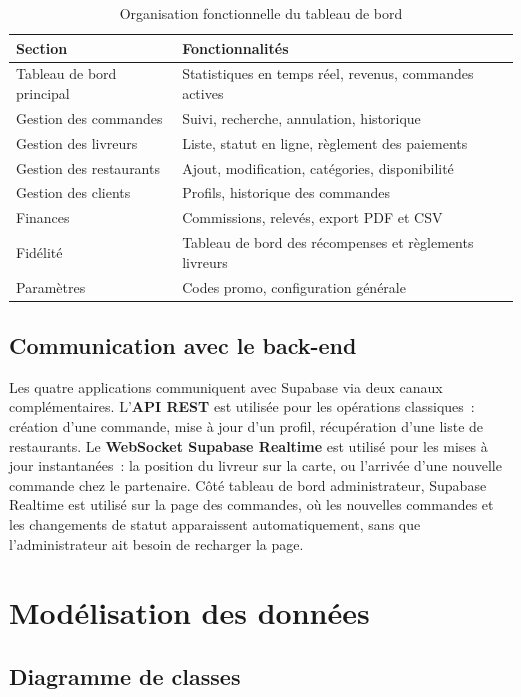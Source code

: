 \documentclass[12pt,fleqn,a4paper]{report}
\begin{document}
\begin{justify}
\begin{table}[H]
\centering
\renewcommand{\arraystretch}{1.4}
\begin{tabular}{|l|l|}
\hline
\textbf{Section} & \textbf{Fonctionnalités} \\
\hline
Tableau de bord principal & Statistiques en temps réel, revenus, commandes actives \\
\hline
Gestion des commandes & Suivi, recherche, annulation, historique \\
\hline
Gestion des livreurs & Liste, statut en ligne, règlement des paiements \\
\hline
Gestion des restaurants & Ajout, modification, catégories, disponibilité \\
\hline
Gestion des clients & Profils, historique des commandes \\
\hline
Finances & Commissions, relevés, export PDF et CSV \\
\hline
Fidélité & Tableau de bord des récompenses et règlements livreurs \\
\hline
Paramètres & Codes promo, configuration générale \\
\hline
\end{tabular}
\caption{Organisation fonctionnelle du tableau de bord}
\label{tab:pages_admin}
\end{table}

\subsection{Communication avec le back-end}

Les quatre applications communiquent avec Supabase via deux canaux complémentaires. L'\textbf{API REST} est utilisée pour les opérations classiques~: création d'une commande, mise à jour d'un profil, récupération d'une liste de restaurants. Le \textbf{WebSocket Supabase Realtime} est utilisé pour les mises à jour instantanées~: la position du livreur sur la carte, ou l'arrivée d'une nouvelle commande chez le partenaire. Côté tableau de bord administrateur, Supabase Realtime est utilisé sur la page des commandes, où les nouvelles commandes et les changements de statut apparaissent automatiquement, sans que l'administrateur ait besoin de recharger la page.

\section{Modélisation des données}

\subsection{Diagramme de classes}


\end{justify}
\end{document}
